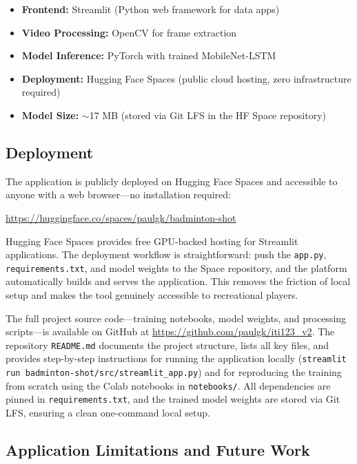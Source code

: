 \documentclass[11pt,a4paper]{article}
\begin{document}
\begin{itemize}
\item \textbf{Frontend:} Streamlit (Python web framework for data apps)
\item \textbf{Video Processing:} OpenCV for frame extraction
\item \textbf{Model Inference:} PyTorch with trained MobileNet-LSTM
\item \textbf{Deployment:} Hugging Face Spaces (public cloud hosting, zero infrastructure required)
\item \textbf{Model Size:} $\sim$17 MB (stored via Git LFS in the HF Space repository)
\end{itemize}

\subsection{Deployment}\label{sec:deployment}

The application is publicly deployed on Hugging Face Spaces and accessible to anyone with a web browser---no installation required:

\begin{center}
\url{https://huggingface.co/spaces/paulgk/badminton-shot}
\end{center}

Hugging Face Spaces provides free GPU-backed hosting for Streamlit applications. The deployment workflow is straightforward: push the \texttt{app.py}, \texttt{requirements.txt}, and model weights to the Space repository, and the platform automatically builds and serves the application. This removes the friction of local setup and makes the tool genuinely accessible to recreational players.

The full project source code---training notebooks, model weights, and processing scripts---is available on GitHub at \url{https://github.com/paulgk/iti123_v2}. The repository \texttt{README.md} documents the project structure, lists all key files, and provides step-by-step instructions for running the application locally (\texttt{streamlit run badminton-shot/src/streamlit\_app.py}) and for reproducing the training from scratch using the Colab notebooks in \texttt{notebooks/}. All dependencies are pinned in \texttt{requirements.txt}, and the trained model weights are stored via Git LFS, ensuring a clean one-command local setup.

\subsection{Application Limitations and Future Work}
\end{document}
